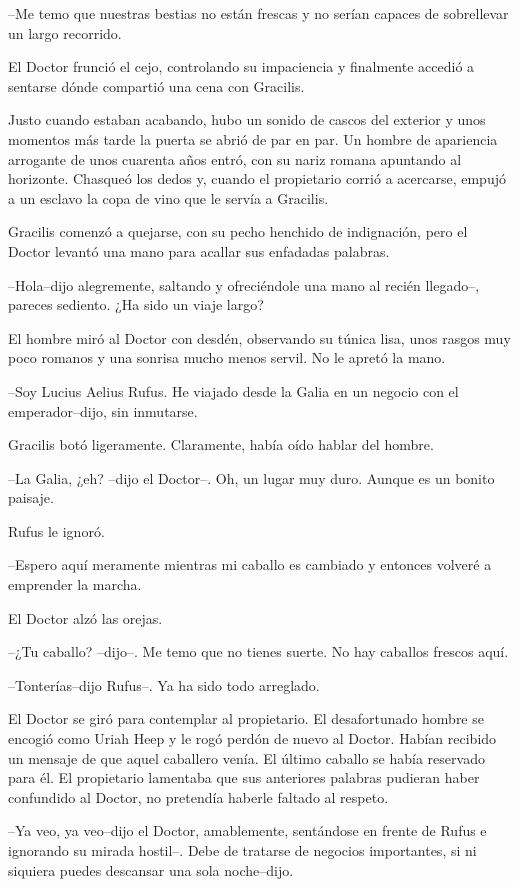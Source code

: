 --Me temo que nuestras bestias no están frescas y no serían capaces de
sobrellevar un largo recorrido.

El Doctor frunció el cejo, controlando su impaciencia y finalmente
accedió a sentarse dónde compartió una cena con Gracilis.

Justo cuando estaban acabando, hubo un sonido de cascos del exterior y
unos momentos más tarde la puerta se abrió de par en par. Un hombre de
apariencia arrogante de unos cuarenta años entró, con su nariz romana
apuntando al horizonte. Chasqueó los dedos y, cuando el propietario
corrió a acercarse, empujó a un esclavo la copa de vino que le servía a
Gracilis.

Gracilis comenzó a quejarse, con su pecho henchido de indignación, pero
el Doctor levantó una mano para acallar sus enfadadas palabras.

--Hola--dijo alegremente, saltando y ofreciéndole una mano al recién
llegado--, pareces sediento. ¿Ha sido un viaje largo?

El hombre miró al Doctor con desdén, observando su túnica lisa, unos
rasgos muy poco romanos y una sonrisa mucho menos servil. No le apretó
la mano.

--Soy Lucius Aelius Rufus. He viajado desde la Galia en un negocio con
el emperador--dijo, sin inmutarse.

Gracilis botó ligeramente. Claramente, había oído hablar del hombre.

--La Galia, ¿eh? --dijo el Doctor--. Oh, un lugar muy duro. Aunque es un
bonito paisaje.

Rufus le ignoró.

--Espero aquí meramente mientras mi caballo es cambiado y entonces
volveré a emprender la marcha.

El Doctor alzó las orejas.

--¿Tu caballo? --dijo--. Me temo que no tienes suerte. No hay caballos
frescos aquí.

--Tonterías--dijo Rufus--. Ya ha sido todo arreglado.

El Doctor se giró para contemplar al propietario. El desafortunado
hombre se encogió como Uriah Heep y le rogó perdón de nuevo al Doctor.
Habían recibido un mensaje de que aquel caballero venía. El último
caballo se había reservado para él. El propietario lamentaba que sus
anteriores palabras pudieran haber confundido al Doctor, no pretendía
haberle faltado al respeto.

--Ya veo, ya veo--dijo el Doctor, amablemente, sentándose en frente de
Rufus e ignorando su mirada hostil--. Debe de tratarse de negocios
importantes, si ni siquiera puedes descansar una sola noche--dijo.

